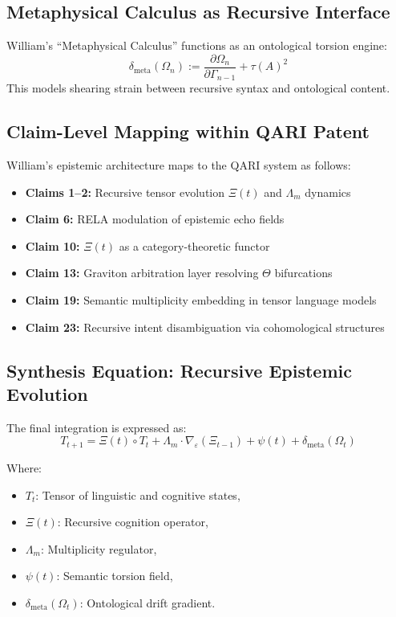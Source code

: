 \documentclass[12pt]{article}
\begin{document}
\subsection{Metaphysical Calculus as Recursive Interface}

William’s “Metaphysical Calculus” functions as an ontological torsion engine:
\[
\delta_{\text{meta}}(\Omega_n) := \frac{\partial \Omega_n}{\partial \Gamma_{n-1}} + \tau(A)^2
\]
This models shearing strain between recursive syntax and ontological content.

\subsection{Claim-Level Mapping within QARI Patent}

William’s epistemic architecture maps to the QARI system as follows:
\begin{itemize}
    \item \textbf{Claims 1–2:} Recursive tensor evolution $\Xi(t)$ and $\Lambda_m$ dynamics
    \item \textbf{Claim 6:} RELA modulation of epistemic echo fields
    \item \textbf{Claim 10:} $\Xi(t)$ as a category-theoretic functor
    \item \textbf{Claim 13:} Graviton arbitration layer resolving $\Theta$ bifurcations
    \item \textbf{Claim 19:} Semantic multiplicity embedding in tensor language models
    \item \textbf{Claim 23:} Recursive intent disambiguation via cohomological structures
\end{itemize}

\subsection{Synthesis Equation: Recursive Epistemic Evolution}

The final integration is expressed as:
\[
T_{t+1} = \Xi(t) \circ T_t + \Lambda_m \cdot \nabla_\varepsilon(\Xi_{t-1}) + \psi(t) + \delta_{\text{meta}}(\Omega_t)
\]

Where:
\begin{itemize}
    \item $T_t$: Tensor of linguistic and cognitive states,
    \item $\Xi(t)$: Recursive cognition operator,
    \item $\Lambda_m$: Multiplicity regulator,
    \item $\psi(t)$: Semantic torsion field,
    \item $\delta_{\text{meta}}(\Omega_t)$: Ontological drift gradient.
\end{itemize}
\end{document}
